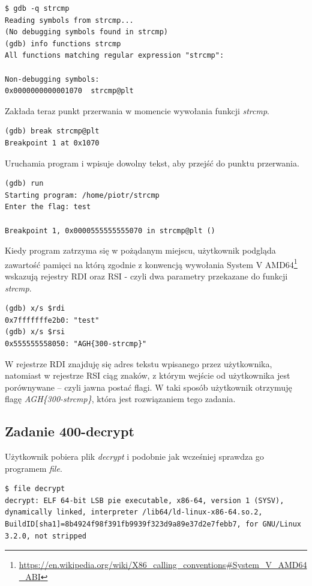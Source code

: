 \documentclass[polish,12pt]{aghthesis}
\begin{document}
\begin{verbatim}
$ gdb -q strcmp
Reading symbols from strcmp...
(No debugging symbols found in strcmp)
(gdb) info functions strcmp
All functions matching regular expression "strcmp":

Non-debugging symbols:
0x0000000000001070  strcmp@plt
\end{verbatim}

Zakłada teraz punkt przerwania w momencie wywołania funkcji \emph{strcmp}.

\begin{verbatim}
(gdb) break strcmp@plt
Breakpoint 1 at 0x1070
\end{verbatim}

Uruchamia program i wpisuje dowolny tekst, aby przejść do punktu przerwania.

\begin{verbatim}
(gdb) run
Starting program: /home/piotr/strcmp 
Enter the flag: test

Breakpoint 1, 0x0000555555555070 in strcmp@plt ()
\end{verbatim}

Kiedy program zatrzyma się w pożądanym miejscu, użytkownik podgląda zawartość pamięci na którą
zgodnie z konwencją wywołania System V AMD64\footnote{
\url{https://en.wikipedia.org/wiki/X86_calling_conventions\#System_V_AMD64_ABI}}
wskazują rejestry RDI oraz RSI - czyli dwa parametry przekazane do funkcji \emph{strcmp}.

\begin{verbatim}
(gdb) x/s $rdi
0x7fffffffe2b0: "test"
(gdb) x/s $rsi
0x555555558050: "AGH{300-strcmp}"
\end{verbatim}

W rejestrze RDI znajduję się adres tekstu wpisanego przez użytkownika, natomiast
w rejestrze RSI ciąg znaków, z którym wejście od użytkownika jest porównywane -- czyli
jawna postać flagi. W taki sposób użytkownik otrzymuję flagę \emph{AGH\{300-strcmp\}},
która jest rozwiązaniem tego zadania.
\clearpage

\subsection{Zadanie 400-decrypt}

Użytkownik pobiera plik \emph{decrypt} i podobnie jak wcześniej sprawdza go programem \emph{file}.

\begin{verbatim}
$ file decrypt
decrypt: ELF 64-bit LSB pie executable, x86-64, version 1 (SYSV), dynamically linked, interpreter /lib64/ld-linux-x86-64.so.2, BuildID[sha1]=8b4924f98f391fb9939f323d9a89e37d2e7febb7, for GNU/Linux 3.2.0, not stripped
\end{verbatim}
\end{document}
